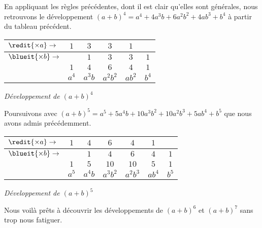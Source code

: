 \medskip

En appliquant les règles précédentes, dont il est clair qu'elles sont générales, nous retrouvons le développement $(a + b)^4 = a^4 + 4 a^3 b + 6 a^2 b^2 + 4 a b^3 + b^4$ à partir du tableau précédent.

\medskip
\begin{center}
\begin{tabular}{|l*{5}{|c}|}
	\hline
	$\redit{\times a} \rightarrow$	&
		$1$    &  $3$      &  $3$        &  $1$      &
	\\ \hline\hline
	$\blueit{\times b} \rightarrow$	&
		       &  $1$      &  $3$        &  $3$      &  $1$
	\\ \hline\hline\hline\hline
		&
		$1$    &  $4$      &  $6$        &  $4$      &  $1$
	\\ \hline
	    &
		$a^4$  &  $a^3 b$  &  $a^2 b^2$  &  $a b^2$  &  $b^4$
	\\ \hline
\end{tabular}

\smallskip
\itshape\small
Développement de $(a + b)^4$
\end{center}


\medskip

Poursuivons avec $(a + b)^5 = a^5 + 5 a^4 b + 10 a^3 b^2 + 10 a^2 b^3 + 5 a b^4 + b^5$ que nous avons admis précédemment.

\medskip
\begin{center}
\begin{tabular}{|l*{6}{|c}|}
	\hline
	$\redit{\times a} \rightarrow$	&
		$1$    &  $4$      &  $6$        &  $4$        &  $1$      &
	\\ \hline\hline
	$\blueit{\times b} \rightarrow$	&
		       &  $1$      &  $4$        &  $6$        &  $4$      &  $1$
	\\ \hline\hline\hline\hline
		&
		$1$    &  $5$      &  $10$       &  $10$       &  $5$      &  $1$
	\\ \hline
	    &
		$a^5$  &  $a^4 b$  &  $a^3 b^2$  &  $a^2 b^3$  &  $a b^4$  &  $b^5$
	\\ \hline
\end{tabular}

\smallskip
\itshape\small
Développement de $(a + b)^5$
\end{center}


\medskip

Nous voilà prêts à découvrir les développements de $(a + b)^6$ et $(a + b)^7$ sans trop nous fatiguer.


